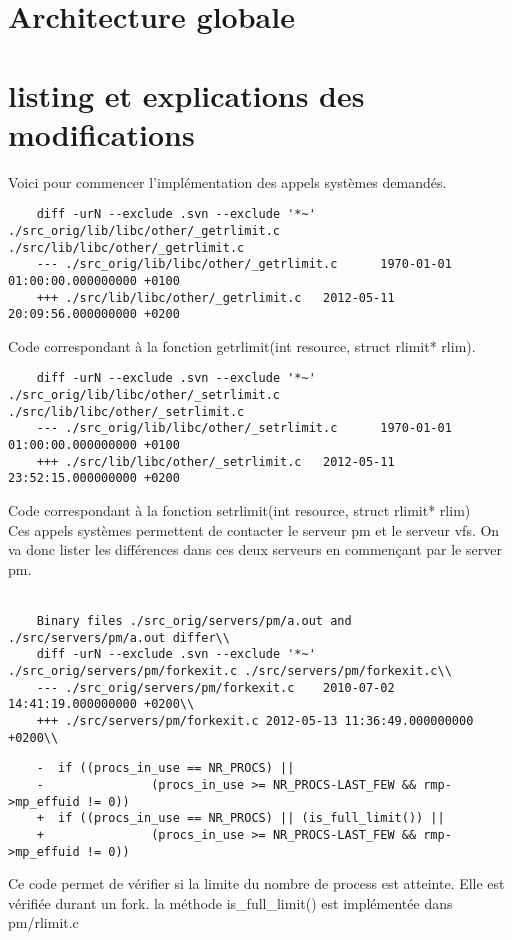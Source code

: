 \documentclass[9pt , a4paper]{article}
\begin{document}
	\section{Architecture globale}
	
	
	\section{listing et explications des modifications}
	
	Voici pour commencer l'implémentation des appels systèmes demandés.\\
	\begin{lstlisting}														 
	diff -urN --exclude .svn --exclude '*~' ./src_orig/lib/libc/other/_getrlimit.c ./src/lib/libc/other/_getrlimit.c
	--- ./src_orig/lib/libc/other/_getrlimit.c      1970-01-01 01:00:00.000000000 +0100
	+++ ./src/lib/libc/other/_getrlimit.c   2012-05-11 20:09:56.000000000 +0200
	\end{lstlisting}
	Code correspondant à la fonction getrlimit(int resource, struct rlimit* rlim). \\ 
	\begin{lstlisting}
	diff -urN --exclude .svn --exclude '*~' ./src_orig/lib/libc/other/_setrlimit.c ./src/lib/libc/other/_setrlimit.c
	--- ./src_orig/lib/libc/other/_setrlimit.c      1970-01-01 01:00:00.000000000 +0100
	+++ ./src/lib/libc/other/_setrlimit.c   2012-05-11 23:52:15.000000000 +0200
	\end{lstlisting}
	Code correspondant à la fonction setrlimit(int resource, struct rlimit* rlim) \\
	Ces appels systèmes permettent de contacter le serveur pm et le serveur vfs. On va donc lister les différences dans ces 	deux serveurs en commençant par le server pm. 
	\\ \\
	\begin{lstlisting}
	Binary files ./src_orig/servers/pm/a.out and ./src/servers/pm/a.out differ\\
	diff -urN --exclude .svn --exclude '*~' ./src_orig/servers/pm/forkexit.c ./src/servers/pm/forkexit.c\\
	--- ./src_orig/servers/pm/forkexit.c    2010-07-02 14:41:19.000000000 +0200\\
	+++ ./src/servers/pm/forkexit.c 2012-05-13 11:36:49.000000000 +0200\\ 
	\end{lstlisting}
	\begin{lstlisting}
	-  if ((procs_in_use == NR_PROCS) || 
	-               (procs_in_use >= NR_PROCS-LAST_FEW && rmp->mp_effuid != 0))
	+  if ((procs_in_use == NR_PROCS) || (is_full_limit()) || 
	+               (procs_in_use >= NR_PROCS-LAST_FEW && rmp->mp_effuid != 0))
    	 \end{lstlisting}

	Ce code permet de vérifier si la limite du nombre de process est atteinte. Elle est vérifiée durant un fork. la méthode is\_full\_limit() est implémentée dans pm/rlimit.c
\end{document}
